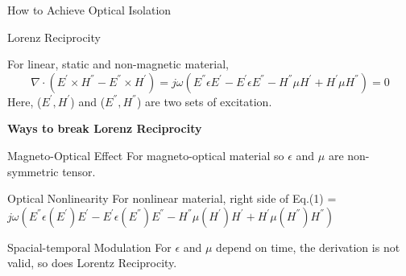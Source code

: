 \documentclass{beamer}
\begin{document}
\begin{frame}{How to Achieve Optical Isolation}
    \begin{block}{Lorenz Reciprocity}

For linear, static and non-magnetic material,
     \vskip -0.75cm
\begin{equation}
\nabla \cdot (\textbf{$E^{'}$} \times\textbf{$H^{''}$} - \textbf{$E^{''}$} \times\textbf{$H^{'}$}) = j\omega(\textbf{$E^{''}$} \textbf{$\epsilon$} \textbf{$E^{'}$} - \textbf{$E^{'}$} \textbf{$\epsilon$} \textbf{$E^{''}$} - H^{''} \mu \textbf{$H^{'}$}+H^{'} \mu \textbf{$H^{''}$} ) = 0 
\end{equation}
     \vskip -0.25cm
Here, ($E^{'}, H^{'}$) and ($E^{''}, H^{''}$) are two sets of excitation.
  \end{block}
  


  
\textbf{Ways to break Lorenz Reciprocity}
    \begin{block}{Magneto-Optical Effect}
For magneto-optical material so $\epsilon$ and $\mu$ are non-symmetric tensor.
  \end{block}
  \begin{block}{Optical Nonlinearity}
For nonlinear material, right side of Eq.(1) = $j\omega(\textbf{$E^{''}$} \textbf{$\epsilon$}(E^{'}) \textbf{$E^{'}$} - \textbf{$E^{'}$} \textbf{$\epsilon$}(E^{''}) \textbf{$E^{''}$} - H^{''} \mu(H^{'}) \textbf{$H^{'}$}+H^{'} \mu(H^{''}) \textbf{$H^{''}$} )$
  \end{block}
  \begin{block}{Spacial-temporal Modulation}
 For $\epsilon$ and $\mu$ depend on time, the derivation is not valid, so does Lorentz Reciprocity.
  \end{block}
\end{frame}
\end{document}
